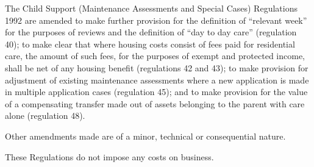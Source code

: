 \documentclass[a4paper]{article}
\begin{document}
  The Child Support (Maintenance Assessments and Special Cases) Regulations 1992 are amended to make further provision for the definition of “relevant week” for the purposes of reviews and the definition of “day to day care” (regulation 40); to make clear that where housing costs consist of fees paid for residential care, the amount of such fees, for the purposes of exempt and protected income, shall be net of any housing benefit (regulations 42 and 43); to make provision for adjustment of existing maintenance assessments where a new application is made in multiple application cases (regulation 45); and to make provision for the value of a compensating transfer made out of assets belonging to the parent with care alone (regulation 48).

  Other amendments made are of a minor, technical or consequential nature.

  These Regulations do not impose any costs on business.
\end{document}

